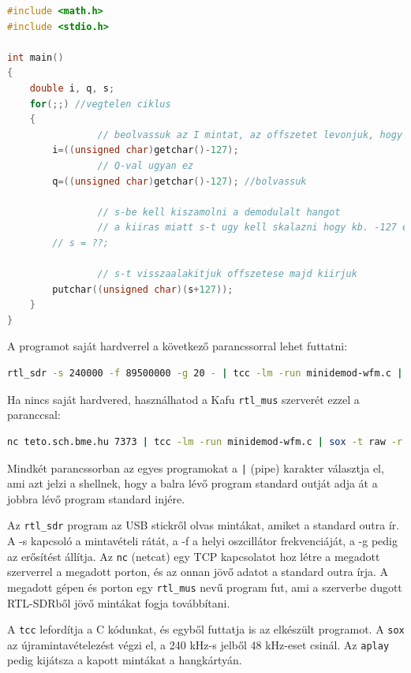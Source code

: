 \documentclass[12pt,a4paper]{article}
\begin{document}
\begin{lstlisting}[frame=single,language=c,caption=Kiinduló kód]
#include <math.h>
#include <stdio.h>

int main()
{
	double i, q, s;
	for(;;) //vegtelen ciklus
	{
                // beolvassuk az I mintat, az offszetet levonjuk, hogy a 0 tenyleg 0 legyen
		i=((unsigned char)getchar()-127); 
                // Q-val ugyan ez
		q=((unsigned char)getchar()-127); //bolvassuk
	
                // s-be kell kiszamolni a demodulalt hangot
                // a kiiras miatt s-t ugy kell skalazni hogy kb. -127 es 128 koze essen.
		// s = ??;

                // s-t visszaalakitjuk offszetese majd kiirjuk
		putchar((unsigned char)(s+127));
	}
}
\end{lstlisting}

\clearpage
A programot saját hardverrel a következő parancssorral lehet futtatni:
\begin{lstlisting}[frame=single,language=bash]
 rtl_sdr -s 240000 -f 89500000 -g 20 - | tcc -lm -run minidemod-wfm.c | sox -t raw -r 240000 -e unsigned -b 8 -c 1 - -t raw - rate 48000 | aplay -f U8 -c1 -r 48000 --buffer-size=200000
\end{lstlisting}

Ha nincs saját hardvered, használhatod a Kafu \texttt{rtl\_mus} szerverét ezzel a paranccsal:
\begin{lstlisting}[frame=single,language=bash]
nc teto.sch.bme.hu 7373 | tcc -lm -run minidemod-wfm.c | sox -t raw -r 240000 -e unsigned -b 8 -c 1 - -t raw - rate 48000 | aplay -f U8 -c1 -r 48000 --buffer-size=200000
\end{lstlisting}

Mindkét parancssorban az egyes programokat a \texttt{|} (pipe) karakter választja el, ami azt jelzi a shellnek,
hogy a balra lévő program standard outját adja át a jobbra lévő program standard injére.

Az \texttt{rtl\_sdr} program az USB stickről olvas mintákat, amiket a standard outra ír. A -s kapcsoló a mintavételi rátát, a -f a helyi oszcillátor frekvenciáját, a -g pedig az erősítést állítja.
Az \texttt{nc} (netcat) egy TCP kapcsolatot hoz létre a megadott szerverrel a megadott porton, és az onnan jövő adatot a standard outra írja.
A megadott gépen és porton egy \texttt{rtl\_mus} nevű program fut, ami a szerverbe dugott RTL-SDRből jövő mintákat fogja továbbítani.

A \texttt{tcc} lefordítja a C kódunkat, és egyből futtatja is az elkészült programot.
A \texttt{sox} az újramintavételezést végzi el, a 240 kHz-s jelből 48 kHz-eset csinál.
Az \texttt{aplay} pedig kijátsza a kapott mintákat a hangkártyán.
\end{document}
